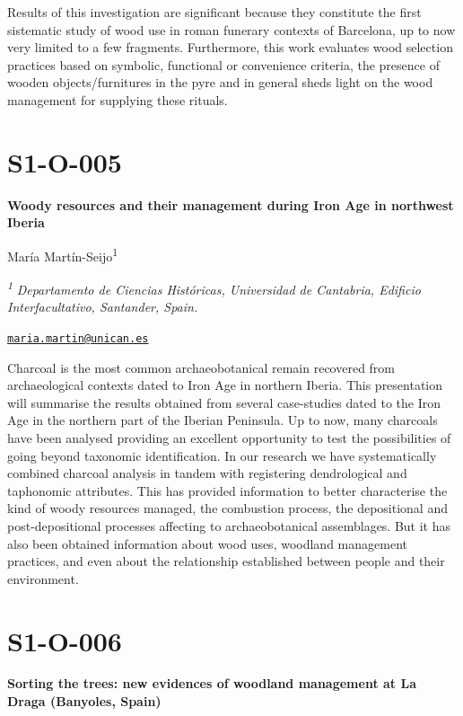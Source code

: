 \documentclass[
]{book}
\begin{document}
Results of this investigation are significant because they constitute the first sistematic study of wood use in roman funerary contexts of Barcelona, up to now very limited to a few fragments. Furthermore, this work evaluates wood selection practices based on symbolic, functional or convenience criteria, the presence of wooden objects/furnitures in the pyre and in general sheds light on the wood management for supplying these rituals.

\hypertarget{s1-o-005}{%
\section*{S1-O-005}\label{s1-o-005}}

\textbf{Woody resources and their management during Iron Age in northwest Iberia}

María Martín-Seijo\textsuperscript{1}

\textsuperscript{\emph{1}} \emph{Departamento de Ciencias Históricas, Universidad de Cantabria, Edificio Interfacultativo, Santander, Spain.}

\href{mailto:maria.martin@unican.es}{\nolinkurl{maria.martin@unican.es}}

Charcoal is the most common archaeobotanical remain recovered from archaeological contexts dated to Iron Age in northern Iberia. This presentation will summarise the results obtained from several case-studies dated to the Iron Age in the northern part of the Iberian Peninsula. Up to now, many charcoals have been analysed providing an excellent opportunity to test the possibilities of going beyond taxonomic identification. In our research we have systematically combined charcoal analysis in tandem with registering dendrological and taphonomic attributes. This has provided information to better characterise the kind of woody resources managed, the combustion process, the depositional and post-depositional processes affecting to archaeobotanical assemblages. But it has also been obtained information about wood uses, woodland management practices, and even about the relationship established between people and their environment.

\hypertarget{s1-o-006}{%
\section*{S1-O-006}\label{s1-o-006}}

\textbf{Sorting the trees: new evidences of woodland management at La Draga (Banyoles, Spain)}
\end{document}
